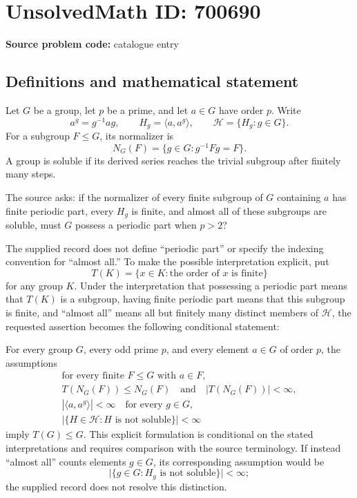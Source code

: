 \documentclass[11pt]{article}
\begin{document}
\section*{UnsolvedMath ID: 700690}
\textbf{Source problem code:} catalogue entry
\subsection{Definitions and mathematical statement}
Let \(G\) be a group, let \(p\) be a prime, and let \(a\in G\) have order \(p\). Write
\[
a^g=g^{-1}ag,\qquad H_g=\langle a,a^g\rangle,\qquad \mathcal H=\{H_g:g\in G\}.
\]
For a subgroup \(F\leq G\), its normalizer is
\[
N_G(F)=\{g\in G:g^{-1}Fg=F\}.
\]
A group is soluble if its derived series reaches the trivial subgroup after finitely many steps.

The source asks: if the normalizer of every finite subgroup of \(G\) containing \(a\) has finite periodic part, every \(H_g\) is finite, and almost all of these subgroups are soluble, must \(G\) possess a periodic part when \(p>2\)?

The supplied record does not define ``periodic part'' or specify the indexing convention for ``almost all.'' To make the possible interpretation explicit, put
\[
T(K)=\{x\in K:\text{the order of }x\text{ is finite}\}
\]
for any group \(K\). Under the interpretation that possessing a periodic part means that \(T(K)\) is a subgroup, having finite periodic part means that this subgroup is finite, and ``almost all'' means all but finitely many distinct members of \(\mathcal H\), the requested assertion becomes the following conditional statement:

For every group \(G\), every odd prime \(p\), and every element \(a\in G\) of order \(p\), the assumptions
\[
\begin{gathered}
\text{for every finite }F\leq G\text{ with }a\in F,
\\
T(N_G(F))\leq N_G(F)\quad\text{and}\quad |T(N_G(F))|<\infty,
\\[2pt]
|\langle a,a^g\rangle|<\infty\quad\text{for every }g\in G,
\\[2pt]
\bigl|\{H\in\mathcal H:H\text{ is not soluble}\}\bigr|<\infty
\end{gathered}
\]
imply \(T(G)\leq G\). This explicit formulation is conditional on the stated interpretations and requires comparison with the source terminology. If instead ``almost all'' counts elements \(g\in G\), its corresponding assumption would be
\[
\bigl|\{g\in G:H_g\text{ is not soluble}\}\bigr|<\infty;
\]
the supplied record does not resolve this distinction.
\end{document}
